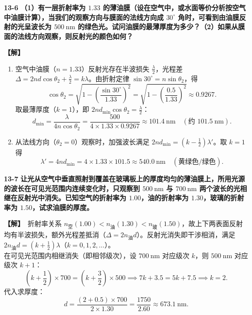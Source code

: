 \documentclass[zihao=5,a4paper,UTF8]{ctexart}
\newenvironment{prob}[2]{%
    \par\vspace{6pt}\noindent\textbf{\color{navy}#1} \textbf{#2}\par\nopagebreak\vspace{2pt}%
}{%
    \par\vspace{4pt}%
}
\newcommand{\sol}{\noindent\textbf{\color{tealaccent}【解】}\ }
\begin{document}
\begin{prob}{13-6}{（1）有一层折射率为 $1.33$ 的薄油膜（设在空气中，或水面等价分析按空气中油膜计算），当我们的观察方向与膜面的法线方向成 $30^\circ$ 角时，可看到由油膜反射的光呈波长为 $500\ \mathrm{nm}$ 的绿色光。试问油膜的最薄厚度为多少？（2）如果从膜面的法线方向观察，则反射光的颜色如何？}
\sol
\begin{enumerate}[leftmargin=2em, itemsep=2pt]
    \item 空气中油膜（$n=1.33$）反射光存在半波损失 $\frac{\lambda}{2}$，光程差 $\Delta = 2nd\cos\theta_2 + \frac{\lambda}{2} = k\lambda$。由折射定律 $\sin 30^\circ = n\sin\theta_2$，得
    \[
        \cos\theta_2 = \sqrt{1 - \left(\frac{\sin 30^\circ}{1.33}\right)^2} = \sqrt{1 - \left(\frac{0.5}{1.33}\right)^2} \approx 0.9267.
    \]
    取最薄厚度（$k=1$），即 $2nd_{\min}\cos\theta_2 = \frac{\lambda}{2}$：
    \[
        d_{\min} = \frac{\lambda}{4n\cos\theta_2} = \frac{500}{4\times 1.33\times 0.9267} \approx 101.4\ \mathrm{nm}\quad (\text{约 } 101.5\ \mathrm{nm}).
    \]
    \item 从法线方向（$\theta_2 = 0$）观察时，加强波长满足 $2nd_{\min} = \left(k - \frac{1}{2}\right)\lambda'$。取 $k=1$ 得
    \[
        \lambda' = 4nd_{\min} = 4\times 1.33\times 101.5 \approx 540.0\ \mathrm{nm}\quad (\text{黄绿色/绿色}).
    \]
\end{enumerate}
\end{prob}

\begin{prob}{13-7}{让光从空气中垂直照射到覆盖在玻璃板上的厚度均匀的薄油膜上，所用光源的波长在可见光范围内连续变化时，只观察到 $500\ \mathrm{nm}$ 与 $700\ \mathrm{nm}$ 两个波长的光相继在反射光中消失。已知空气的折射率为 $1.00$，油的折射率为 $1.30$，玻璃的折射率为 $1.50$，试求油膜的厚度。}
\sol 折射率关系 $n_{\text{空}}(1.00) < n_{\text{油}}(1.30) < n_{\text{玻}}(1.50)$，故上下两表面反射均有半波损失，额外光程差抵消（$\Delta = 2n_{\text{油}}d$）。反射光消失即干涉相消，满足 $2n_{\text{油}}d = \left(k + \frac{1}{2}\right)\lambda$（$k=0,1,2,\dots$）。\\
在可见光范围内相继消失（即相邻级次），设 $700\ \mathrm{nm}$ 对应级次 $k$，则 $500\ \mathrm{nm}$ 对应级次 $k+1$：
\[
    \left(k + \frac{1}{2}\right)\times 700 = \left(k + \frac{3}{2}\right)\times 500 \implies 7k + 3.5 = 5k + 7.5 \implies k = 2.
\]
代入求厚度：
\[
    d = \frac{(2 + 0.5)\times 700}{2\times 1.30} = \frac{1750}{2.60} \approx 673.1\ \mathrm{nm}.
\]
\end{prob}
\end{document}
